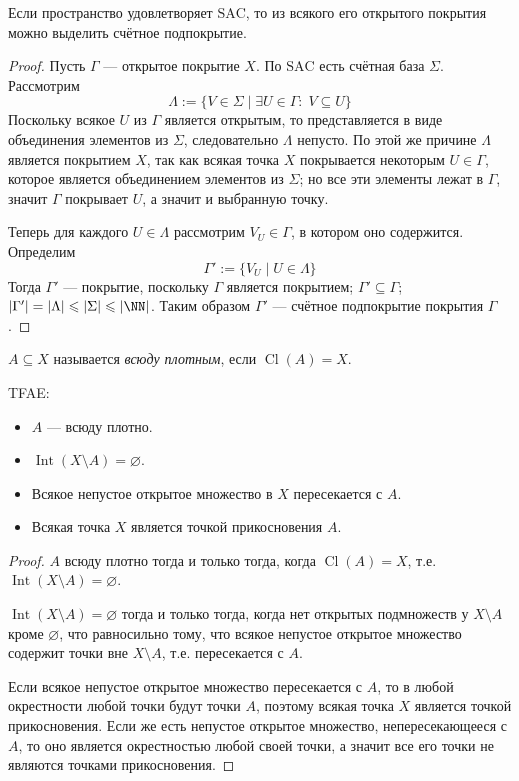 \documentclass[12pt,a4paper]{article}
\DeclareMathOperator{\Int}{Int}
\DeclareMathOperator{\Cl}{Cl}
\newcommand{\SAC}{\ensuremath{\mathrm{SAC}}\xspace}
\begin{document}
    \begin{theorem}
        Если пространство удовлетворяет \SAC, то из всякого его открытого покрытия можно выделить счётное подпокрытие.
    \end{theorem}

    \begin{proof}
        Пусть $\Gamma$ --- открытое покрытие $X$. По \SAC есть счётная база $\Sigma$. Рассмотрим
        \[\Lambda := \{V \in \Sigma \mid \exists U \in \Gamma:\; V \subseteq U\}\]
        Поскольку всякое $U$ из $\Gamma$ является открытым, то представляется в виде объединения элементов из $\Sigma$, следовательно $\Lambda$ непусто. По этой же причине $\Lambda$ является покрытием $X$, так как всякая точка $X$ покрывается некоторым $U \in \Gamma$, которое является объединением элементов из $\Sigma$; но все эти элементы лежат в $\Gamma$, значит $\Gamma$ покрывает $U$, а значит и выбранную точку.

        Теперь для каждого $U \in \Lambda$ рассмотрим $V_U \in \Gamma$, в котором оно содержится. Определим
        \[\Gamma' := \{V_U \mid U \in \Lambda\}\]
        Тогда $\Gamma'$ --- покрытие, поскольку $\Gamma$ является покрытием; $\Gamma' \subseteq \Gamma$; $|\Gamma'| = |\Lambda| \leqslant |\Sigma| \leqslant |\NN|$. Таким образом $\Gamma'$ --- счётное подпокрытие покрытия $\Gamma$.
    \end{proof}

    \begin{definition}
        $A \subseteq X$ называется \emph{всюду плотным}, если $\Cl(A) = X$.
    \end{definition}

    \begin{lemma}
        TFAE:
        \begin{itemize}
            \item $A$ --- всюду плотно.
            \item $\Int(X \setminus A) = \varnothing$.
            \item Всякое непустое открытое множество в $X$ пересекается с $A$.
            \item Всякая точка $X$ является точкой прикосновения $A$.
        \end{itemize}
    \end{lemma}

    \begin{proof}
        $A$ всюду плотно тогда и только тогда, когда $\Cl(A) = X$, т.е. $\Int(X \setminus A) = \varnothing$.

        $\Int(X \setminus A) = \varnothing$ тогда и только тогда, когда нет открытых подмножеств у $X \setminus A$ кроме $\varnothing$, что равносильно тому, что всякое непустое открытое множество содержит точки вне $X \setminus A$, т.е. пересекается с $A$.

        Если всякое непустое открытое множество пересекается с $A$, то в любой окрестности любой точки будут точки $A$, поэтому всякая точка $X$ является точкой прикосновения. Если же есть непустое открытое множество, непересекающееся с $A$, то оно является окрестностью любой своей точки, а значит все его точки не являются точками прикосновения.
    \end{proof}
\end{document}

